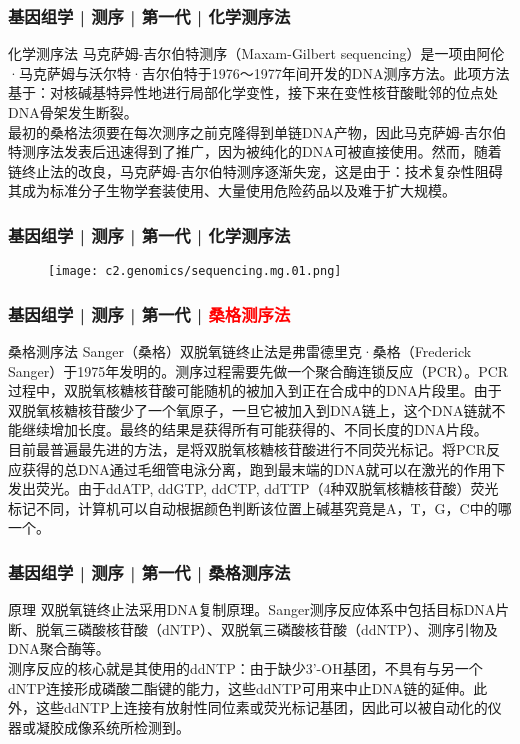\begin{frame}
  \frametitle{基因组学 | 测序 | 第一代 | 化学测序法}
  \begin{block}{化学测序法}
马克萨姆-吉尔伯特测序（Maxam-Gilbert sequencing）是一项由阿伦·马克萨姆与沃尔特·吉尔伯特于1976～1977年间开发的DNA测序方法。此项方法基于：对核碱基特异性地进行局部化学变性，接下来在变性核苷酸毗邻的位点处DNA骨架发生断裂。\\
\vspace{1em}
最初的桑格法须要在每次测序之前克隆得到单链DNA产物，因此马克萨姆-吉尔伯特测序法发表后迅速得到了推广，因为被纯化的DNA可被直接使用。然而，随着链终止法的改良，马克萨姆-吉尔伯特测序逐渐失宠，这是由于：技术复杂性阻碍其成为标准分子生物学套装使用、大量使用危险药品以及难于扩大规模。
  \end{block}
\end{frame}

\begin{frame}
  \frametitle{基因组学 | 测序 | 第一代 | 化学测序法}
  \begin{figure}
    \centering
    \texttt{[image: c2.genomics/sequencing.mg.01.png]}
  \end{figure}
\end{frame}

\begin{frame}
  \frametitle{基因组学 | 测序 | 第一代 | \textcolor{red}{桑格测序法}}
  \begin{block}{桑格测序法}
Sanger（桑格）双脱氧链终止法是弗雷德里克·桑格（Frederick Sanger）于1975年发明的。测序过程需要先做一个聚合酶连锁反应（PCR）。PCR过程中，双脱氧核糖核苷酸可能随机的被加入到正在合成中的DNA片段里。由于双脱氧核糖核苷酸少了一个氧原子，一旦它被加入到DNA链上，这个DNA链就不能继续增加长度。最终的结果是获得所有可能获得的、不同长度的DNA片段。\\
\vspace{1em}
目前最普遍最先进的方法，是将双脱氧核糖核苷酸进行不同荧光标记。将PCR反应获得的总DNA通过毛细管电泳分离，跑到最末端的DNA就可以在激光的作用下发出荧光。由于ddATP, ddGTP, ddCTP, ddTTP（4种双脱氧核糖核苷酸）荧光标记不同，计算机可以自动根据颜色判断该位置上碱基究竟是A，T，G，C中的哪一个。 
  \end{block}
\end{frame}

\begin{frame}
  \frametitle{基因组学 | 测序 | 第一代 | 桑格测序法}
  \begin{block}{原理}
双脱氧链终止法采用DNA复制原理。Sanger测序反应体系中包括目标DNA片断、脱氧三磷酸核苷酸（dNTP）、双脱氧三磷酸核苷酸（ddNTP）、测序引物及DNA聚合酶等。\\
\vspace{1em}
测序反应的核心就是其使用的ddNTP：由于缺少3'-OH基团，不具有与另一个dNTP连接形成磷酸二酯键的能力，这些ddNTP可用来中止DNA链的延伸。此外，这些ddNTP上连接有放射性同位素或荧光标记基团，因此可以被自动化的仪器或凝胶成像系统所检测到。
  \end{block}
\end{frame}

